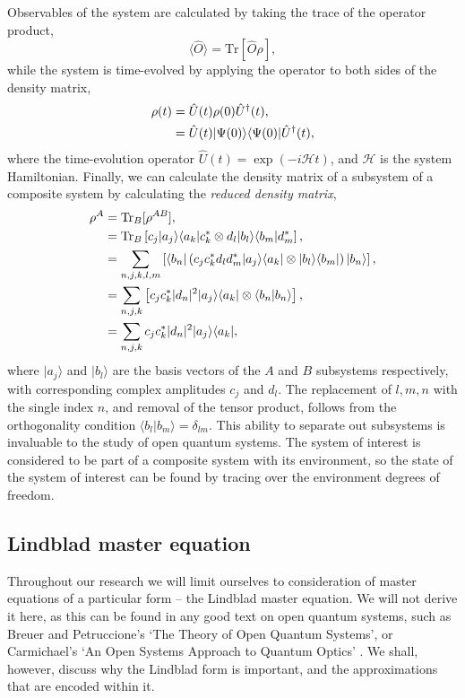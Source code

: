 Observables of the system are calculated by taking the trace of the operator product,
\begin{equation}
	\langle \hat{O} \rangle = \mathrm{Tr}[\hat{O}\rho],
	\label{eq:oqs2-5}
\end{equation}
while the system is time-evolved by applying the operator to both sides of the density matrix,
\begin{align}
	\rho (t) &= \hat{U}(t) \rho(0) \hat{U}^{\dagger}(t), \notag \\
	&= \hat{U}(t) | \Psi(0) \rangle \langle \Psi(0) | \hat{U}^{\dagger}(t),
	\label{eq:oqs2-6}
\end{align}  
where the time-evolution operator \(\hat{U}(t) = \exp(-i\mathcal{H}t)\), and \(\mathcal{H}\) is the system Hamiltonian. Finally, we can calculate the density matrix of a subsystem of a composite system by calculating the \emph{reduced density matrix},
\begin{align}
	\rho^{A} &= \mathrm{Tr}_{B}[\rho^{AB}], \notag \\
	&= \mathrm{Tr}_{B}\left[ c_{j}|a_{j} \rangle \langle a_{k}|c_{k}^{*} \otimes d_{l}|b_{l} \rangle \langle b_{m}|d_{m}^{*} \right], \notag \\
	&= \sum_{n,j,k,l,m}\left[ \langle b_{n} | \left( c_{j}c_{k}^{*}d_{l}d_{m}^{*} |a_{j} \rangle \langle a_{k}| \otimes |b_{l} \rangle \langle b_{m}| \right) | b_{n} \rangle \right], \notag \\ 
	&= \sum_{n,j,k} \left[ c_{j}c_{k}^{*}|d_{n}|^{2} |a_{j} \rangle \langle a_{k}| \otimes \langle b_{n} | b_{n} \rangle \right], \notag \\
	&= \sum_{n,j,k} c_{j}c_{k}^{*}|d_{n}|^{2} |a_{j} \rangle \langle a_{k}|,
	\label{eq:oqs2-7}
\end{align}
where \(|a_{j} \rangle\) and \(|b_{l} \rangle\) are the basis vectors of the \(A\) and \(B\) subsystems respectively, with corresponding complex amplitudes \(c_{j}\) and \(d_{l}\). The replacement of \(l,m,n\) with the single index \(n\), and removal of the tensor product, follows from the orthogonality condition \(\langle b_{l} | b_{m} \rangle = \delta_{lm}\). This ability to separate out subsystems is invaluable to the study of open quantum systems. The system of interest is considered to be part of a composite system with its environment, so the state of the system of interest can be found by tracing over the environment degrees of freedom.

\subsection{\label{sec:lindblad}Lindblad master equation}
Throughout our research we will limit ourselves to consideration of master equations of a particular form -- the Lindblad master equation. We will not derive it here, as this can be found in any good text on open quantum systems, such as Breuer and Petruccione's `The Theory of Open Quantum Systems', or Carmichael's `An Open Systems Approach to Quantum Optics' \cite{BP_TMQME,Carmichael_OSAQO}. We shall, however, discuss why the Lindblad form is important, and the approximations that are encoded within it. 

